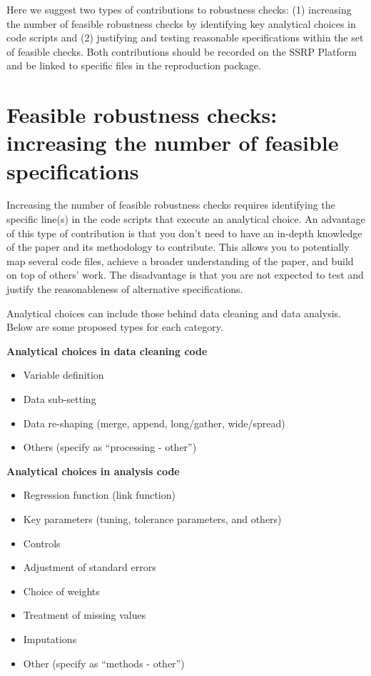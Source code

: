 \documentclass[
  openany]{book}
\providecommand{\tightlist}{%
  \setlength{\itemsep}{0pt}\setlength{\parskip}{0pt}}
\begin{document}
Here we suggest two types of contributions to robustness checks: (1) increasing the number of feasible robustness checks by identifying key analytical choices in code scripts and (2) justifying and testing reasonable specifications within the set of feasible checks. Both contributions should be recorded on the SSRP Platform and be linked to specific files in the reproduction package.

\hypertarget{feasible-robustness-checks-increasing-the-number-of-feasible-specifications}{%
\section{Feasible robustness checks: increasing the number of feasible specifications}\label{feasible-robustness-checks-increasing-the-number-of-feasible-specifications}}

Increasing the number of feasible robustness checks requires identifying the specific line(s) in the code scripts that execute an analytical choice. An advantage of this type of contribution is that you don't need to have an in-depth knowledge of the paper and its methodology to contribute. This allows you to potentially map several code files, achieve a broader understanding of the paper, and build on top of others' work. The disadvantage is that you are not expected to test and justify the reasonableness of alternative specifications.

Analytical choices can include those behind data cleaning and data analysis. Below are some proposed types for each category.

\textbf{Analytical choices in data cleaning code}

\begin{itemize}
\tightlist
\item
  Variable definition
\item
  Data sub-setting
\item
  Data re-shaping (merge, append, long/gather, wide/spread)
\item
  Others (specify as ``processing - other'')
\end{itemize}

\textbf{Analytical choices in analysis code}

\begin{itemize}
\tightlist
\item
  Regression function (link function)
\item
  Key parameters (tuning, tolerance parameters, and others)
\item
  Controls
\item
  Adjustment of standard errors
\item
  Choice of weights
\item
  Treatment of missing values
\item
  Imputations
\item
  Other (specify as ``methods - other'')
\end{itemize}
\end{document}
